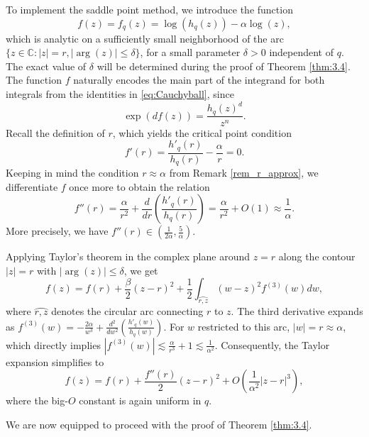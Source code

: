 \documentclass[a4paper,twoside, reqno]{amsart}
\numberwithin{equation}{section}
\theoremstyle{definition}%
\theoremstyle{definition}
\theoremstyle{definition}%
\theoremstyle{definition}
\begin{document}
To implement the saddle point method, we introduce the function 
\begin{equation}
\label{eq:fdefi}
    f(z) = f_q(z) = \log(h_q(z)) - \alpha \log(z),
\end{equation}
which is analytic on a sufficiently small neighborhood of the arc $\{z \in \mathbb{C} : |z|=r, |\arg(z)| \leq \delta\}$, for a small parameter $\delta > 0$ independent of $q$. The exact value of $\delta$ will be determined during the proof of Theorem \ref{thm:3.4}. 
The function $f$ naturally encodes the main part of the integrand for both integrals from the identities in \eqref{eq:Cauchyball}, since 
\[
\exp(df(z)) = \frac{h_q(z)^d}{z^n}.
\]
Recall the definition of $r$, which yields the critical point condition
\[
f'(r) = \frac{h'_q(r)}{h_q(r)} - \frac{\alpha}{r} = 0.
\]
Keeping in mind the condition $r\approx \alpha$ from Remark \ref{rem_r_approx}, we differentiate $f$ once more to obtain the relation
\[
f''(r) = \frac{\alpha}{r^2} + \frac{d}{dr}\left(\frac{h'_q(r)}{h_q(r)}\right) = \frac{\alpha}{r^2} + O(1) \approx \frac{1}{\alpha}.
\]
More precisely, we have $f''(r)\in(\frac{1}{2\alpha}, \frac{5}{\alpha})$. 

Applying Taylor's theorem in the complex plane around $z=r$ along the contour $|z|=r$ with $|\arg(z)| \leq \delta$, we get
\[
    f(z) = f(r) + \frac{\beta}{2}(z-r)^2 + \frac{1}{2} \int_{\wideparen{r,z}} (w-z)^2 f^{(3)}(w) dw,
\]
where $\wideparen{r,z}$ denotes the circular arc connecting $r$ to $z$. 
The third derivative expands as $f^{(3)}(w) = -\frac{2\alpha}{w^3} + \frac{d^2}{dw^2}\left(\frac{h'_q(w)}{h_q(w)}\right)$. 
For $w$ restricted to this arc, $|w| = r \approx \alpha$, which directly implies $|f^{(3)}(w)| \lesssim \frac{\alpha}{r^3} + 1 \lesssim \frac{1}{\alpha^2}$. 
Consequently, the Taylor expansion simplifies to
\begin{equation}
\label{eq:ftay}
    f(z) = f(r) + \frac{f''(r)}{2}(z-r)^2 + O\left(\frac{1}{\alpha^2}|z-r|^3\right),
\end{equation}
where the big-$O$ constant is again uniform in $q$.

\par 

We are now equipped to proceed with the proof of Theorem \ref{thm:3.4}.
\end{document}
